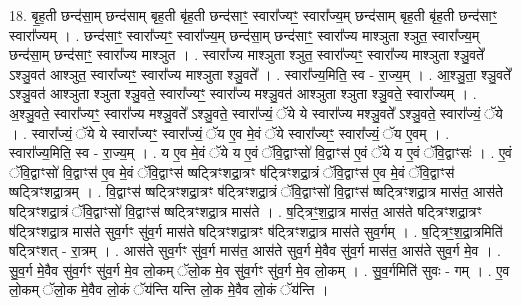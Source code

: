 \documentclass[17pt]{extarticle}
\begin{document}
18. बृ॒ह॒ती छन्द॑सा॒म् छन्द॑साम् बृह॒ती बृ॑ह॒ती छन्द॑साꣳ॒॒ स्वारा᳚ज्यꣳ॒॒ स्वारा᳚ज्य॒म् छन्द॑साम् बृह॒ती बृ॑ह॒ती छन्द॑साꣳ॒॒ स्वारा᳚ज्यम् । . छन्द॑साꣳ॒॒ स्वारा᳚ज्यꣳ॒॒ स्वारा᳚ज्य॒म् छन्द॑सा॒म् छन्द॑साꣳ॒॒ स्वारा᳚ज्य माश्ञुता श्ञुत॒ स्वारा᳚ज्य॒म् छन्द॑सा॒म् छन्द॑साꣳ॒॒ स्वारा᳚ज्य माश्ञुत । . स्वारा᳚ज्य माश्ञुता श्ञुत॒ स्वारा᳚ज्यꣳ॒॒ स्वारा᳚ज्य माश्ञुता श्ञु॒वते᳚ ऽश्ञु॒वत॑ आश्ञुत॒ स्वारा᳚ज्यꣳ॒॒ स्वारा᳚ज्य माश्ञुता श्ञु॒वते᳚ । . स्वारा᳚ज्य॒मिति॒ स्व - रा॒ज्य॒म् । . आ॒श्ञु॒ता॒ श्ञु॒वते᳚ ऽश्ञु॒वत॑ आश्ञुता श्ञुता श्ञु॒वते॒ स्वारा᳚ज्यꣳ॒॒ स्वारा᳚ज्य मश्ञु॒वत॑ आश्ञुता श्ञुता श्ञु॒वते॒ स्वारा᳚ज्यम् । . अ॒श्ञु॒वते॒ स्वारा᳚ज्यꣳ॒॒ स्वारा᳚ज्य मश्ञु॒वते᳚ ऽश्ञु॒वते॒ स्वारा᳚ज्यं॒ ॅये ये स्वारा᳚ज्य मश्ञु॒वते᳚ ऽश्ञु॒वते॒ स्वारा᳚ज्यं॒ ॅये । . स्वारा᳚ज्यं॒ ॅये ये स्वारा᳚ज्यꣳ॒॒ स्वारा᳚ज्यं॒ ॅय ए॒व मे॒वं ॅये स्वारा᳚ज्यꣳ॒॒ स्वारा᳚ज्यं॒ ॅय ए॒वम् । . स्वारा᳚ज्य॒मिति॒ स्व - रा॒ज्य॒म् । . य ए॒व मे॒वं ॅये य ए॒वं ॅवि॒द्वाꣳसो॑ वि॒द्वाꣳस॑ ए॒वं ॅये य ए॒वं ॅवि॒द्वाꣳसः॑ । . ए॒वं ॅवि॒द्वाꣳसो॑ वि॒द्वाꣳस॑ ए॒व मे॒वं ॅवि॒द्वाꣳस॑ ष्षट्त्रिꣳशद्रा॒त्रꣳ ष॑ट्त्रिꣳशद्रा॒त्रं ॅवि॒द्वाꣳस॑ ए॒व मे॒वं ॅवि॒द्वाꣳस॑ ष्षट्त्रिꣳशद्रा॒त्रम् । . वि॒द्वाꣳस॑ ष्षट्त्रिꣳशद्रा॒त्रꣳ ष॑ट्त्रिꣳशद्रा॒त्रं ॅवि॒द्वाꣳसो॑ वि॒द्वाꣳस॑ ष्षट्त्रिꣳशद्रा॒त्र मास॑त॒ आस॑ते षट्त्रिꣳशद्रा॒त्रं ॅवि॒द्वाꣳसो॑ वि॒द्वाꣳस॑ ष्षट्त्रिꣳशद्रा॒त्र मास॑ते । . ष॒ट्त्रिꣳ॒॒श॒द्रा॒त्र मास॑त॒ आस॑ते षट्त्रिꣳशद्रा॒त्रꣳ ष॑ट्त्रिꣳशद्रा॒त्र मास॑ते सुव॒र्गꣳ सु॑व॒र्ग मास॑ते षट्त्रिꣳशद्रा॒त्रꣳ ष॑ट्त्रिꣳशद्रा॒त्र मास॑ते सुव॒र्गम् । . ष॒ट्त्रिꣳ॒॒श॒द्रा॒त्रमिति॑ षट्त्रिꣳशत् - रा॒त्रम् । . आस॑ते सुव॒र्गꣳ सु॑व॒र्ग मास॑त॒ आस॑ते सुव॒र्ग मे॒वैव सु॑व॒र्ग मास॑त॒ आस॑ते सुव॒र्ग मे॒व । . सु॒व॒र्ग मे॒वैव सु॑व॒र्गꣳ सु॑व॒र्ग मे॒व लो॒कम् ॅलो॒क मे॒व सु॑व॒र्गꣳ सु॑व॒र्ग मे॒व लो॒कम् । . सु॒व॒र्गमिति॑ सुवः - गम् । . ए॒व लो॒कम् ॅलो॒क मे॒वैव लो॒कं ॅय॑न्ति यन्ति लो॒क मे॒वैव लो॒कं ॅय॑न्ति । \newline
\end{document}
